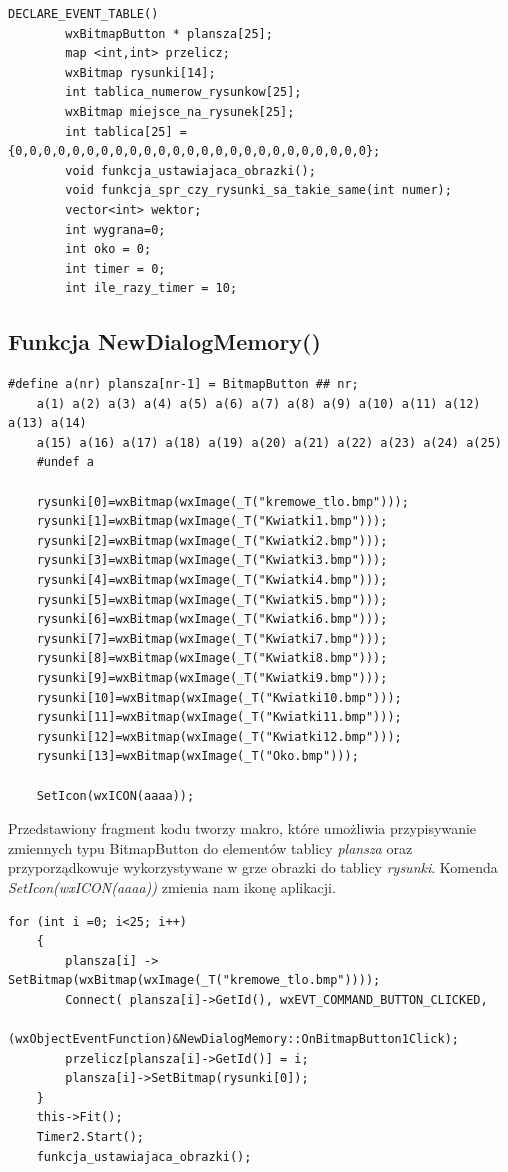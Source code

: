 \documentclass[a4paper]{article}
\begin{document}
\begin{verbatim}
DECLARE_EVENT_TABLE()
		wxBitmapButton * plansza[25];
        map <int,int> przelicz;
        wxBitmap rysunki[14];
        int tablica_numerow_rysunkow[25];
        wxBitmap miejsce_na_rysunek[25];
        int tablica[25] = {0,0,0,0,0,0,0,0,0,0,0,0,0,0,0,0,0,0,0,0,0,0,0,0,0};
        void funkcja_ustawiajaca_obrazki();
        void funkcja_spr_czy_rysunki_sa_takie_same(int numer);
        vector<int> wektor;
        int wygrana=0;
        int oko = 0;
        int timer = 0;
        int ile_razy_timer = 10;
\end{verbatim}
\subsection{Funkcja NewDialogMemory()}
\begin{verbatim}
#define a(nr) plansza[nr-1] = BitmapButton ## nr;
    a(1) a(2) a(3) a(4) a(5) a(6) a(7) a(8) a(9) a(10) a(11) a(12) a(13) a(14)
    a(15) a(16) a(17) a(18) a(19) a(20) a(21) a(22) a(23) a(24) a(25)
    #undef a

    rysunki[0]=wxBitmap(wxImage(_T("kremowe_tlo.bmp")));
    rysunki[1]=wxBitmap(wxImage(_T("Kwiatki1.bmp")));
    rysunki[2]=wxBitmap(wxImage(_T("Kwiatki2.bmp")));
    rysunki[3]=wxBitmap(wxImage(_T("Kwiatki3.bmp")));
    rysunki[4]=wxBitmap(wxImage(_T("Kwiatki4.bmp")));
    rysunki[5]=wxBitmap(wxImage(_T("Kwiatki5.bmp")));
    rysunki[6]=wxBitmap(wxImage(_T("Kwiatki6.bmp")));
    rysunki[7]=wxBitmap(wxImage(_T("Kwiatki7.bmp")));
    rysunki[8]=wxBitmap(wxImage(_T("Kwiatki8.bmp")));
    rysunki[9]=wxBitmap(wxImage(_T("Kwiatki9.bmp")));
    rysunki[10]=wxBitmap(wxImage(_T("Kwiatki10.bmp")));
    rysunki[11]=wxBitmap(wxImage(_T("Kwiatki11.bmp")));
    rysunki[12]=wxBitmap(wxImage(_T("Kwiatki12.bmp")));
    rysunki[13]=wxBitmap(wxImage(_T("Oko.bmp")));

    SetIcon(wxICON(aaaa));
\end{verbatim}
Przedstawiony fragment kodu tworzy makro, które umożliwia przypisywanie zmiennych typu BitmapButton do elementów tablicy \emph{plansza} oraz przyporządkowuje wykorzystywane w grze obrazki do tablicy \emph{rysunki}. Komenda \emph{SetIcon(wxICON(aaaa))} zmienia nam ikonę aplikacji. 
\begin{verbatim}
for (int i =0; i<25; i++)
    {
        plansza[i] -> SetBitmap(wxBitmap(wxImage(_T("kremowe_tlo.bmp"))));
        Connect( plansza[i]->GetId(), wxEVT_COMMAND_BUTTON_CLICKED,
                (wxObjectEventFunction)&NewDialogMemory::OnBitmapButton1Click);
        przelicz[plansza[i]->GetId()] = i;
        plansza[i]->SetBitmap(rysunki[0]);
    }
    this->Fit();
    Timer2.Start();
    funkcja_ustawiajaca_obrazki();
\end{verbatim}
\end{document}
